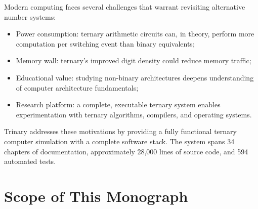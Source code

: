 \documentclass[10pt,a4paper,twoside]{book}
\begin{document}
Modern computing faces several challenges that warrant revisiting alternative number
systems:
\begin{itemize}
    \item Power consumption: ternary arithmetic circuits can, in theory, perform more
          computation per switching event than binary equivalents;
    \item Memory wall: ternary's improved digit density could reduce memory traffic;
    \item Educational value: studying non-binary architectures deepens understanding of
          computer architecture fundamentals;
    \item Research platform: a complete, executable ternary system enables experimentation
          with ternary algorithms, compilers, and operating systems.
\end{itemize}

Trinary addresses these motivations by providing a fully functional ternary computer
simulation with a complete software stack. The system spans 34 chapters of
documentation, approximately 28,000 lines of source code, and 594 automated tests.

\section{Scope of This Monograph}
\end{document}

